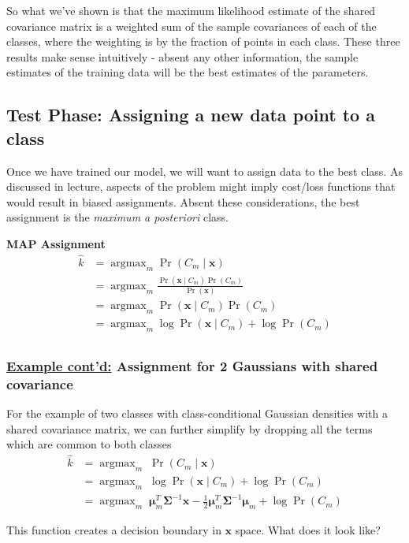 \documentclass[11pt]{article}
\DeclareMathOperator*{\argmax}{argmax}
\newcommand{\xb}{\mathbf{x}}
\newcommand{\ub}{\symbf{\mu}}
\newcommand{\uS}{\symbf{\Sigma}}
\newenvironment{propertybox}{%
   \def\FrameCommand{\colorbox{LightSteelBlue}}%
   \MakeFramed{\advance\hsize-\width \FrameRestore}}
 {\endMakeFramed}
\begin{document}
\begin{framed}
So what we've shown is that the maximum likelihood estimate of the shared covariance matrix is a weighted sum of the  sample covariances of each of the classes, where the weighting
is by the fraction of points in each class.  These three results make sense intuitively - absent any other information, the sample estimates of the training data will be the best estimates of
the parameters. 
\end{framed}

\subsection{Test Phase: Assigning a new data point to a class}
Once we have trained our model, we will want to assign data to the best class. As discussed in lecture, aspects of the problem might imply cost/loss functions that would result in biased
assignments. Absent these considerations, the best assignment is the \textit{maximum a posteriori} class.

\begin{center}
\begin{minipage}{0.75\linewidth}
\begin{propertybox}
    \textbf{MAP Assignment}
    \begin{equation*}
    	\begin{split}
		\hat{k} &= \argmax_m \Pr (C_m \mid \xb ) \\
		&= \argmax_m  \frac{\Pr (\xb \mid C_m) \Pr (C_m)}{\Pr (\xb)} \\
		&= \argmax_m \Pr (\xb \mid C_m) \Pr (C_m) \\
		&= \argmax_m \log \Pr (\xb \mid C_m) + \log \Pr (C_m) \\
	\end{split}
    \end{equation*}
\end{propertybox}
\end{minipage}
\end{center}

\begin{framed}
\subsubsection*{\underline{Example cont'd:} Assignment for 2 Gaussians with shared covariance}
For the example of two classes with class-conditional Gaussian densities with a shared covariance matrix, we can further simplify by dropping all the terms which are common
to both classes
\begin{align*}
	\hat{k} &= \argmax_m \; \Pr (C_m \mid \xb ) \\
	&= \argmax_m \; \log \Pr (\xb \mid C_m) + \log \Pr (C_m) \\
	&= \argmax_m \; \ub_m^T \uS^{-1} \xb - \frac{1}{2}\ub_m^T \uS^{-1} \ub_m + \log \Pr (C_m)
\end{align*}

This function creates a decision boundary in $\xb$ space. What does it look like?
\end{framed}
\end{document}
